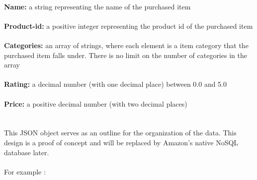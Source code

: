 \documentclass[12pt,a4paper]{article}
\begin{document}
		\\
		\textbf{Name:}  a string representing the name of the purchased item \\
		\\
		\textbf{Product-id:} a positive integer representing the product id of the 
		purchased item\\
		\\
		\textbf{Categories:} an array of strings, where each element is a item category that the purchased item falls under. There is no limit on the number of categories in the array\\
		\\
		\textbf{Rating:} a decimal number (with one decimal place) between 0.0 and 5.0\\
		\\
		\textbf{Price:} a positive decimal number (with two decimal places)\\
		\\\\
		This JSON object serves as an outline for the organization of the data. This design is a proof of concept and will be replaced by Amazon's native NoSQL database later.  \\
		\\
		For example :
		\inputminted{json}{knowledge-representation.json}
		
\end{document}
